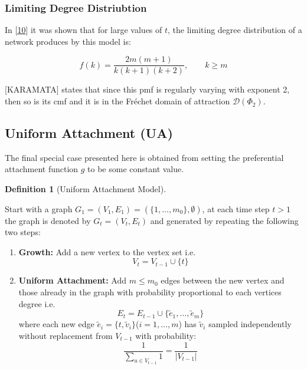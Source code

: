 \documentclass[
  10pt,
  a4paper,
]{scrreprt}
\providecommand{\tightlist}{%
  \setlength{\itemsep}{0pt}\setlength{\parskip}{0pt}}\usepackage{longtable,booktabs,array}
\theoremstyle{plain}
\theoremstyle{plain}
\theoremstyle{definition}
\newtheorem{definition}{Definition}[section]
\theoremstyle{plain}
\theoremstyle{remark}
\begin{document}
{\hypertarget{limiting-degree-distriubtion}{%
\subsubsection{Limiting Degree
Distriubtion}\label{limiting-degree-distriubtion}}

In {[}\protect\hyperlink{ref-barabasibook}{10}{]} it was shown that for
large values of \(t\), the limiting degree distribution of a network
produces by this model is:

\[
f(k) = \frac{2m(m+1)}{k(k+1)(k+2)}, \qquad k\geq m
\]

{[}KARAMATA{]} states that since this pmf is regularly varying with
exponent 2, then so is its cmf and it is in the Fréchet domain of
attraction \(\mathcal D(\Phi_2)\).

\hypertarget{uniform-attachment-ua}{%
\subsection{Uniform Attachment (UA)}\label{uniform-attachment-ua}}

The final special case presented here is obtained from setting the
preferential attachment function \(g\) to be some constant value.

\begin{definition}[Uniform Attachment
Model]\protect\hypertarget{def-ua}{}\label{def-ua}

Start with a graph \(G_1 = (V_1, E_1) = (\{1,\ldots,m_0\}, \emptyset)\),
at each time step \(t>1\) the graph is denoted by \(G_t=(V_t, E_t)\) and
generated by repeating the following two steps:

\begin{enumerate}
\def\labelenumi{\arabic{enumi}.}
\tightlist
\item
  \textbf{Growth:} Add a new vertex to the vertex set i.e.~\[
  V_t=V_{t-1}\cup\{t\}
  \]
\item
  \textbf{Uniform Attachment:} Add \(m\le m_0\) edges between the new
  vertex and those already in the graph with probability proportional to
  each vertices degree i.e.~\[
  E_t  = E_{t-1} \cup \{\tilde e_1, \ldots, \tilde e_m\}
  \] where each new edge
  \(\tilde e_i = \{t, \tilde v_i\}\)(\(i=1,\ldots, m\)) has
  \(\tilde v_i\) sampled independently without replacement from
  \(V_{t-1}\) with probability: \[
  \frac{1}{\sum_{u\in V_{t-1}}1} = \frac{1}{|V_{t-1}|}
  \]
\end{enumerate}

\end{definition}

}
\end{document}
